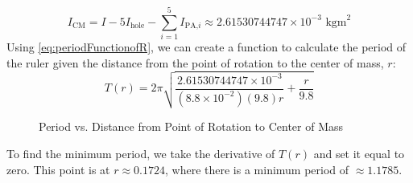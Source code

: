 \documentclass[article, 12pt]{article}
\begin{document}
\begin{enumerate}[1)]
    \begin{equation}
        I_\text{CM} = I - 5I_\text{hole} - \sum_{i=1}^{5} I_{\text{PA,}i} \approx 2.61530744747 \times 10^{-3} \text{ kgm}^2 
    \end{equation}
    Using \autoref{eq:periodFunctionofR}, we can create a function to calculate the period of the ruler given the distance from the point of rotation to the center of mass, $r$:
    \begin{equation}
        T(r) = 2\pi \sqrt{\frac{2.61530744747 \times 10^{-3}}{(8.8 \times 10^{-2})(9.8)r} + \frac{r}{9.8}}
    \end{equation}
    \begin{figure}[H]
    \centering
    \caption{Period vs. Distance from Point of Rotation to Center of Mass}
    \label{fig:TvsR}
    \end{figure}
    To find the minimum period, we take the derivative of $T(r)$ and set it equal to zero. This point is at $r\approx 0.1724$, where there is a minimum period of $\approx 1.1785$.
\end{enumerate}
\end{document}
